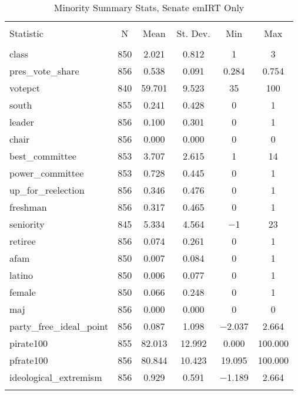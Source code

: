 \documentclass[12pt]{article}
\begin{document}
\begin{table}[!htbp] \centering 
	\caption{Minority Summary Stats, Senate emIRT Only} 
	\label{} 
\begin{tabular}{@{\extracolsep{5pt}}lccccc} 
	\\[-1.8ex]\hline 
	\hline \\[-1.8ex] 
	Statistic & \multicolumn{1}{c}{N} & \multicolumn{1}{c}{Mean} & \multicolumn{1}{c}{St. Dev.} & \multicolumn{1}{c}{Min} & \multicolumn{1}{c}{Max} \\ 
	\hline \\[-1.8ex] 
	class & 850 & 2.021 & 0.812 & 1 & 3 \\ 
	pres\_vote\_share & 856 & 0.538 & 0.091 & 0.284 & 0.754 \\ 
	votepct & 840 & 59.701 & 9.523 & 35 & 100 \\ 
	south & 855 & 0.241 & 0.428 & 0 & 1 \\ 
	leader & 856 & 0.100 & 0.301 & 0 & 1 \\ 
	chair & 856 & 0.000 & 0.000 & 0 & 0 \\ 
	best\_committee & 853 & 3.707 & 2.615 & 1 & 14 \\ 
	power\_committee & 853 & 0.728 & 0.445 & 0 & 1 \\ 
	up\_for\_reelection & 856 & 0.346 & 0.476 & 0 & 1 \\ 
	freshman & 856 & 0.317 & 0.465 & 0 & 1 \\ 
	seniority & 845 & 5.334 & 4.564 & $-$1 & 23 \\ 
	retiree & 856 & 0.074 & 0.261 & 0 & 1 \\ 
	afam & 850 & 0.007 & 0.084 & 0 & 1 \\ 
	latino & 850 & 0.006 & 0.077 & 0 & 1 \\ 
	female & 850 & 0.066 & 0.248 & 0 & 1 \\ 
	maj & 856 & 0.000 & 0.000 & 0 & 0 \\ 
	party\_free\_ideal\_point & 856 & 0.087 & 1.098 & $-$2.037 & 2.664 \\ 
	pirate100 & 855 & 82.013 & 12.992 & 0.000 & 100.000 \\ 
	pfrate100 & 856 & 80.844 & 10.423 & 19.095 & 100.000 \\ 
	ideological\_extremism & 856 & 0.929 & 0.591 & $-$1.189 & 2.664 \\ 
	\hline \\[-1.8ex] 
\end{tabular} 
\end{table}
\end{document}
